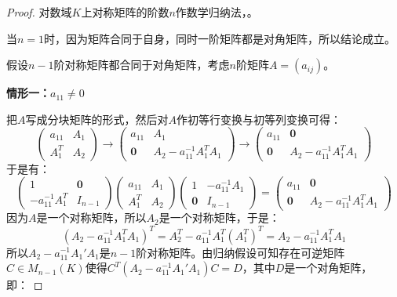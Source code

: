 \begin{proof}
	对数域$K$上对称矩阵的阶数$n$作数学归纳法，。\par
	当$n=1$时，因为矩阵合同于自身，同时一阶矩阵都是对角矩阵，所以结论成立。\par
	假设$n-1$阶对称矩阵都合同于对角矩阵，考虑$n$阶矩阵$A=(a_{ij})$。\par
	\textbf{情形一：$a_{11}\ne 0$}\par
	把$A$写成分块矩阵的形式，然后对$A$作初等行变换与初等列变换可得：
	\begin{equation*}
		\begin{pmatrix}
			a_{11} & A_1 \\
			A_1^T & A_2
		\end{pmatrix}
		\longrightarrow
		\begin{pmatrix}
			a_{11} & A_1 \\
			\mathbf{0} & A_2-a_{11}^{-1}A_1^TA_1
		\end{pmatrix}
		\longrightarrow
		\begin{pmatrix}
			a_{11} & \mathbf{0} \\
			\mathbf{0} & A_2-a_{11}^{-1}A_1^TA_1
		\end{pmatrix}
	\end{equation*}
	于是有：
	\begin{equation*}
		\begin{pmatrix}
			1 & \mathbf{0} \\
			-a_{11}^{-1}A_1^T & I_{n-1}
		\end{pmatrix}
		\begin{pmatrix}
			a_{11} & A_1 \\
			A_1^T & A_2
		\end{pmatrix}
		\begin{pmatrix}
			1 & -a_{11}^{-1}A_1 \\
			\mathbf{0} & I_{n-1}
		\end{pmatrix}
		=
		\begin{pmatrix}
			a_{11} & \mathbf{0} \\
			\mathbf{0} & A_2-a_{11}^{-1}A_1^TA_1
		\end{pmatrix}
	\end{equation*}
	因为$A$是一个对称矩阵，所以$A_2$是一个对称矩阵，于是：
	\begin{equation*}
		(A_2-a_{11}^{-1}A_1^TA_1)^T=A_2^T-a_{11}^{-1}A_1^T(A_1^T)^T=A_2-a_{11}^{-1}A_1^TA_1
	\end{equation*}
	所以$A_2-a_{11}^{-1}A_1'A_1$是$n-1$阶对称矩阵。由归纳假设可知存在可逆矩阵$C\in M_{n-1}(K)$使得$C^T(A_2-a_{11}^{-1}A_1'A_1)C=D$，其中$D$是一个对角矩阵，即：

\end{proof}
